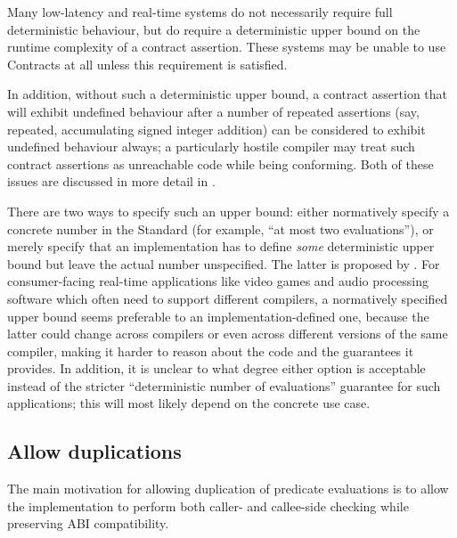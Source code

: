 Many low-latency and real-time systems do not necessarily require full deterministic behaviour, but do require a deterministic upper bound on the runtime complexity of a contract assertion. These systems may be unable to use Contracts at all unless this requirement is satisfied.

In addition, without such a deterministic upper bound, a contract assertion that will exhibit undefined behaviour after a number of repeated assertions (say, repeated, accumulating signed integer addition) can be considered to exhibit undefined behaviour always; a particularly hostile compiler may treat such contract assertions as unreachable code while being conforming. Both of these issues are discussed in more detail in \cite{P3119R0}.

There are two ways to specify such an upper bound: either normatively specify a concrete number in the Standard (for example, ``at most two evaluations''), or merely specify that an implementation has to define \emph{some} deterministic upper bound but leave the actual number unspecified. The latter is proposed by \cite{P3119R0}. For consumer-facing real-time applications like video games and audio processing software which often need to support different compilers, a normatively specified upper bound seems preferable to an implementation-defined one, because the latter could change across compilers or even across different versions of the same compiler, making it harder to reason about the code and the guarantees it provides. In addition, it is unclear to what degree either option is acceptable instead of the stricter ``deterministic number of evaluations'' guarantee for such applications; this will most likely depend on the concrete use case.

\subsection{Allow duplications}
\label{subsec:ville}

The main motivation for allowing duplication of predicate evaluations is to allow the implementation to perform both caller- and callee-side checking while preserving ABI compatibility.

